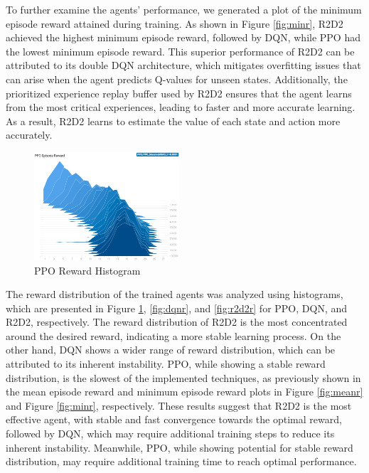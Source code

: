 \documentclass[conference]{IEEEtran}
\begin{document}
To further examine the agents' performance, we generated a plot of the minimum episode reward attained during training. As shown in Figure \ref{fig:minr}, R2D2 achieved the highest minimum episode reward, followed by DQN, while PPO had the lowest minimum episode reward. This superior performance of R2D2 can be attributed to its double DQN architecture, which mitigates overfitting issues that can arise when the agent predicts Q-values for unseen states. Additionally, the prioritized experience replay buffer used by R2D2 ensures that the agent learns from the most critical experiences, leading to faster and more accurate learning. As a result, R2D2 learns to estimate the value of each state and action more accurately.

\begin{figure}[b!]
    \centering
    \includegraphics[width=0.48\textwidth, height=0.35\textwidth]{figures/PPO_Reward.png}
    \caption{PPO Reward Histogram}
    \label{fig:ppor}
\end{figure}

The reward distribution of the trained agents was analyzed using histograms, which are presented in Figure \ref{fig:ppor}, \ref{fig:dqnr}, and \ref{fig:r2d2r} for PPO, DQN, and R2D2, respectively. The reward distribution of R2D2 is the most concentrated around the desired reward, indicating a more stable learning process. On the other hand, DQN shows a wider range of reward distribution, which can be attributed to its inherent instability. PPO, while showing a stable reward distribution, is the slowest of the implemented techniques, as previously shown in the mean episode reward and minimum episode reward plots in Figure \ref{fig:meanr} and Figure \ref{fig:minr}, respectively. These results suggest that R2D2 is the most effective agent, with stable and fast convergence towards the optimal reward, followed by DQN, which may require additional training steps to reduce its inherent instability. Meanwhile, PPO, while showing potential for stable reward distribution, may require additional training time to reach optimal performance.
\end{document}
